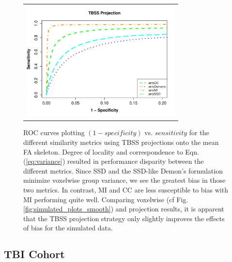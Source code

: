 \documentclass[final,5p,times,twocolumn]{elsarticle}
\begin{document}
\begin{figure}
\begin{center}
\begin{tabular}{c}
  \includegraphics[width=81mm]{ISV_SpeSen_projectionAlreadyAligned.pdf}
\end{tabular}
\caption{ROC curves plotting $(1 - specificity)$ vs. $sensitivity$ for the
different similarity metrics using TBSS projections onto the mean FA skeleton.
Degree of locality and correspondence to 
Eqn. (\ref{eq:variance}) resulted in performance disparity between the
different metrics.  Since SSD and the SSD-like Demon's formulation 
minimize voxelwise group variance, we see the greatest bias in those 
two metrics.  In contrast, MI and CC are less susceptible to bias with
MI performing quite well.  Comparing voxelwise (cf Fig. \ref{fig:simulated_plots_smooth}) 
and projection results, 
it is apparent that the TBSS projection strategy only slightly improves 
the effects of bias for the simulated data.
}
\label{fig:simulated_projection}
\end{center}        
\end{figure}



\subsection{TBI Cohort} 
\end{document}
